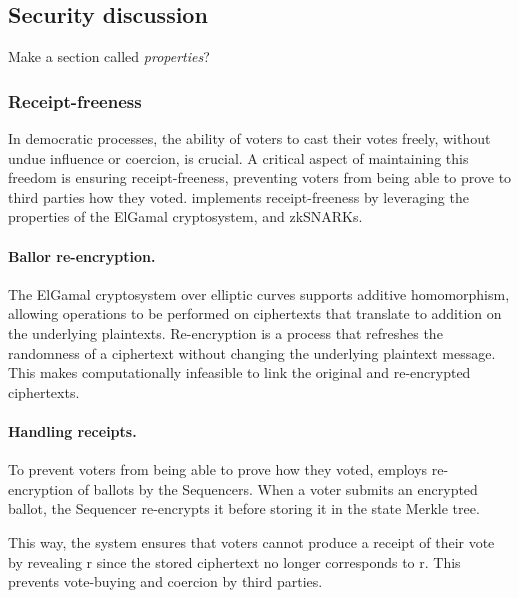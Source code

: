 


\subsection{Security discussion}
\label{sec:analysis:security}

Make a section called \textit{properties}?

\subsubsection{Receipt-freeness}

In democratic processes, the ability of voters to cast their votes freely, without undue influence or coercion, is crucial. A critical aspect of maintaining this freedom is ensuring receipt-freeness, preventing voters from being able to prove to third parties how they voted. \davinci implements receipt-freeness by leveraging the properties of the ElGamal cryptosystem, and zkSNARKs.

\paragraph{Ballor re-encryption.}

The ElGamal cryptosystem over elliptic curves supports additive homomorphism, allowing operations to be performed on ciphertexts that translate to addition on the underlying plaintexts. Re-encryption is a process that refreshes the randomness of a ciphertext without changing the underlying plaintext message. This makes computationally infeasible to link the original and re-encrypted ciphertexts.

\paragraph{Handling receipts.}

To prevent voters from being able to prove how they voted, \davinci employs re-encryption of ballots by the Sequencers. When a voter submits an encrypted ballot, the Sequencer re-encrypts it before storing it in the state Merkle tree.

This way, the system ensures that voters cannot produce a receipt of their vote by revealing r since the stored ciphertext no longer corresponds to r. This prevents vote-buying and coercion by third parties.

